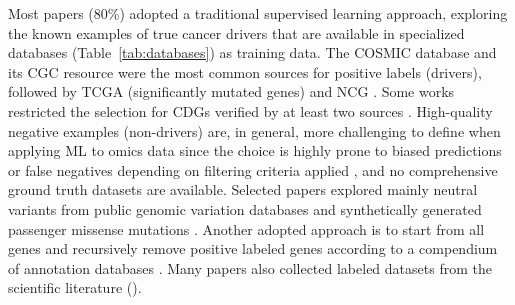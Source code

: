 Most papers (80\%) adopted a traditional supervised learning approach, 
exploring the known examples of true cancer drivers that are available in specialized databases (Table~\ref{tab:databases}) as training data. 
The COSMIC database \cite{cosmic} and its CGC resource \cite{sondka2018cosmic} were the most common sources for positive labels (\ie drivers), followed by TCGA (significantly mutated genes) and NCG \cite{repana2019network}. Some works restricted the selection for CDGs verified by at least two sources \cite{Colaprico2020}. High-quality negative examples (\ie non-drivers) are, in general, more challenging to define when applying ML to omics data \cite{libbrecht2015machine, schubach2017imbalance} since the choice is highly prone to biased predictions or false negatives depending on filtering criteria applied \cite{Rogers+2021}, and no comprehensive ground truth datasets are available. 
Selected papers explored mainly neutral variants from public genomic variation databases \cite{Capriotti2011, Tan2012, U2014} and synthetically generated passenger missense mutations \cite{Carter2009, Soliman2015}. Another adopted approach is to start from all genes and recursively remove positive labeled genes according to a compendium of annotation databases \cite{Schulte-Sasse2019, Wang2020}.
Many papers \cite{Soliman2015, Tokheim2016, Agajanian2018, Collier2019, Luo2019, Nicora2019, Chandrashekar2020, Colaprico2020} also collected labeled datasets from the scientific literature (\eg \cite{Carter2009, tamborero2013comprehensive, vogelstein2013cancer, martelotto2014benchmarking, bailey2018comprehensive}).

